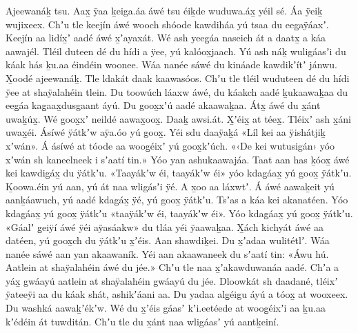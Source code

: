 \begin{pairs}
\begin{Leftside}
Ajeewanáḵ tsu.
Aax̱ ÿaa ḵeiga.áa áwé tsu éiḵ\-de wuduwa.áx̱ yéil sé.
Áa ÿeiḵ wujixeex.
Chʼu tle keejín áwé wooch shóode kawdiháa yú tsaa du eeg̱aÿáaxʼ.
Keejín aa lidíx̱ʼ aadé áwé x̱ʼayaxát.
Wé ash yeeg̱áa naseich át a daatx̱ a káa aawajél.
Tléil duteen dé du hídi a ÿee, yú kalóox̱jaach.
Yú ash náḵ wuligáasʼi du káak hás ḵu.aa éindéin woonee.
\pend
\pstart
{}Wáa nanée sáwé du kináade kawdikʼítʼ jánwu.
X̱oodé ajeewanáḵ.
Tle ldakát daak kaawasóos.
Chʼu tle tléil wuduteen dé du hídi ÿee at shaÿala\-héin tlein.
\pend
\pstart
{}Du toowúch láaxw áwé, du káakch aadé ḵu\-kaawaḵaa du eeg̱áa kag̱aax̱dusgaant áyú.
Du goox̱xʼú aadé akaawaḵaa.
Átx̱ áwé du x̱ánt uwaḵúx̱.
Wé goox̱xʼ neildé aawax̱oox̱.
\hspace{-0.0625em}Daaḵ awsi.át.
\hspace*{-0.1875em}X̱ʼéix̱ at téex̱.
\hspace*{-0.1875em}\hspace{-0.125em}Tléixʼ ash x̱áni uwax̱éi.
Ásíwé ÿátkʼw aÿa.óo yú goox̱.
Yéi sdu daaÿaḵá
«\!Líl kei aa ÿishátjiḵ xʼwán\!».
Á ásíwé at tóode aa woog̱éixʼ yú goox̱kʼúch.
«‹\!De kei wutusigán\!› yóo xʼwán sh kaneelneek i sʼaatí tin.\!»
Yóo yan ashukaawajáa.
\pend
\pstart
{}Taat aan has ḵóox̱ áwé kei kawdig̱áx̱ du ÿátkʼu.
«\!Taayákʼw éi, taayákʼw éi\!» yóo kda\-g̱áax̱ yú goox̱ ÿátkʼu.
Ḵoowa.éin yú aan, yú át naa wligásʼi ÿé.
A x̱oo aa láxwtʼ.
Á áwé aawaḵeit yú aanḵáawuch, yú aadé kdag̱áx̱ ÿé, yú goox̱ ÿátkʼu.
Tsʼas a káa kei akanatéen.
Yóo kdag̱áax̱ yú goox̱ ÿátkʼu
«\!taaÿákʼw éi, taayákʼw éi\!».
Yóo kdag̱áax̱ yú goox̱ ÿátkʼu.
«\!Gáalʼ g̱eiÿí áwé ÿéi aÿasáakw\!» du tláa yéi ÿaawaḵaa.
X̱ách kichyát áwé aa datéen, yú goox̱ch du ÿátkʼu x̱ʼéis.
Aan shawdiḵei.
Du x̱ʼadaa wulitétlʼ.
Wáa nanée sáwé aan yan akaawaník.
Yéi aan akaawaneek du sʼaatí tin:
«\!Áwu hú.
Aatlein at shaÿalahéin áwé du jée.\!»
\pend
\pstart
{}Chʼu tle naa x̱ʼakawduwanáa aadé.
Chʼa a yáx̱ gwáayú aatlein at shaÿalahéin gwáayú du jée.
Dloowkát sh daadané, tléixʼ ÿateeÿi aa du káak shát, ashikʼáani aa.
Du yadaa alg̱éigu áyú a tóox̱ at wooxeex.
Du washká aawaḵʼékʼw.
Wé du x̱ʼéis gáasʼ kʼi.eetéede at woog̱éixʼi aa ḵu.aa kʼédéin át tuwditán.
Chʼu tle du x̱ánt naa wligáasʼ yú aantḵeiní.

\end{Leftside}
\end{pairs}
